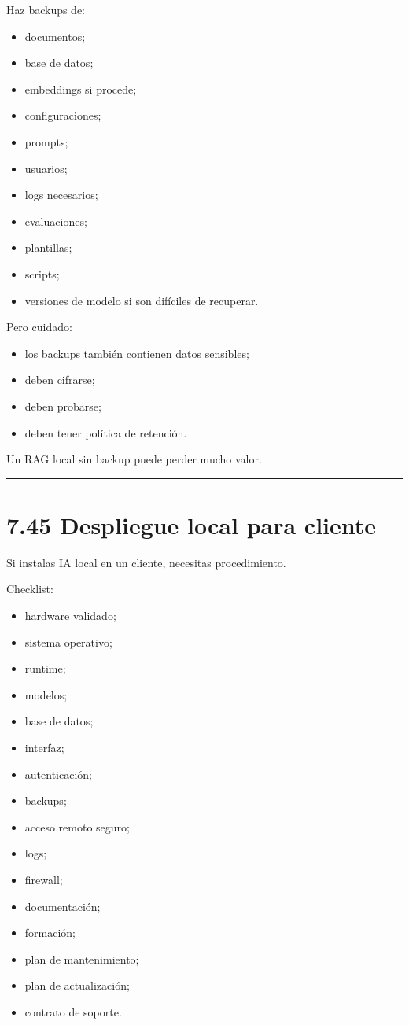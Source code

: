 Haz backups de:

\begin{itemize}
\tightlist
\item
  documentos;
\item
  base de datos;
\item
  embeddings si procede;
\item
  configuraciones;
\item
  prompts;
\item
  usuarios;
\item
  logs necesarios;
\item
  evaluaciones;
\item
  plantillas;
\item
  scripts;
\item
  versiones de modelo si son difíciles de recuperar.
\end{itemize}

Pero cuidado:

\begin{itemize}
\tightlist
\item
  los backups también contienen datos sensibles;
\item
  deben cifrarse;
\item
  deben probarse;
\item
  deben tener política de retención.
\end{itemize}

Un RAG local sin backup puede perder mucho valor.

\begin{center}\rule{0.5\linewidth}{0.5pt}\end{center}

\section{7.45 Despliegue local para
cliente}\label{despliegue-local-para-cliente}

Si instalas IA local en un cliente, necesitas procedimiento.

Checklist:

\begin{itemize}
\tightlist
\item
  hardware validado;
\item
  sistema operativo;
\item
  runtime;
\item
  modelos;
\item
  base de datos;
\item
  interfaz;
\item
  autenticación;
\item
  backups;
\item
  acceso remoto seguro;
\item
  logs;
\item
  firewall;
\item
  documentación;
\item
  formación;
\item
  plan de mantenimiento;
\item
  plan de actualización;
\item
  contrato de soporte.
\end{itemize}

